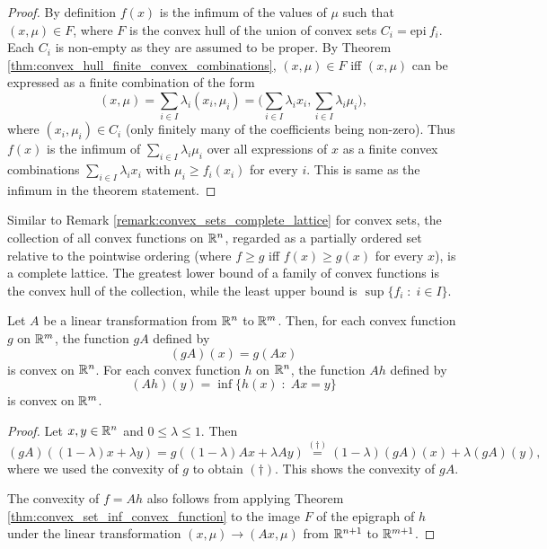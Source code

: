 \documentclass[11pt,a4paper]{article}
\begin{document}
\begin{proof}
    By definition $f(x)$ is the infimum of the values of $\mu$ such that $(x,\mu)\in F$, where $F$ is the convex hull of the union of convex sets $C_i = \text{epi}\ f_i$. Each $C_i$ is non-empty as they are assumed to be proper. By Theorem \ref{thm:convex_hull_finite_convex_combinations}, $(x,\mu)\in F$ iff $(x,\mu)$ can be expressed as a finite combination of the form
    \begin{equation*}
        (x,\mu) = \sum_{i\in I} \lambda_i (x_i,\mu_i) = \bigg(\sum_{i\in I}\lambda_i x_i, \sum_{i\in I}\lambda_i \mu_i \bigg),
    \end{equation*}
    where $(x_i,\mu_i)\in C_i$ (only finitely many of the coefficients being non-zero). Thus $f(x)$ is the infimum of $\sum_{i\in I}\lambda_i \mu_i$ over all expressions of $x$ as a finite convex combinations $\sum_{i\in I}\lambda_i x_i$ with $\mu_i\ge f_i(x_i)$ for every $i$. This is same as the infimum in the theorem statement.
\end{proof}

\begin{remark}
    Similar to Remark \ref{remark:convex_sets_complete_lattice} for convex sets, the collection of all convex functions on $\mathbb{R}^n$, regarded as a partially ordered set relative to the pointwise ordering (where $f\ge g$ iff $f(x)\ge g(x)$ for every $x$), is a complete lattice. The greatest lower bound of a family of convex functions is the convex hull of the collection, while the least upper bound is $\sup\{f_i\;:\;i\in I\}$. 
\end{remark}

\begin{theorem}\label{thm:convex_function_linear_transformation}
    Let $A$ be a linear transformation from $\mathbb{R}^n$ to $\mathbb{R}^m$. Then, for each convex function $g$ on $\mathbb{R}^m$, the function $gA$ defined by
    \begin{equation*}
        (gA)(x) = g(Ax)
    \end{equation*}
    is convex on $\mathbb{R}^n$. For each convex function $h$ on $\mathbb{R}^n$, the function $Ah$ defined by
    \begin{equation*}
        (Ah)(y) = \inf\{h(x)\;:\;Ax = y\}
    \end{equation*}
    is convex on $\mathbb{R}^m$.  
\end{theorem}

\begin{proof}
    Let $x,y\in \mathbb{R}^n$ and $0\le \lambda\le 1$. Then 
    \begin{equation*}
        (gA)((1-\lambda)x+\lambda y) = g((1-\lambda)Ax+\lambda Ay) \overset{(\dagger)}{=} (1-\lambda)(gA)(x) + \lambda (gA)(y),
    \end{equation*}
    where we used the convexity of $g$ to obtain $(\dagger)$. This shows the convexity of $gA$.

    \noindent The convexity of $f = Ah$ also follows from applying Theorem \ref{thm:convex_set_inf_convex_function} to the image $F$ of the epigraph of $h$ under the linear transformation $(x,\mu)\rightarrow (Ax,\mu)$ from $\mathbb{R}^{n+1}$ to $\mathbb{R}^{m+1}$.
\end{proof}
\end{document}
